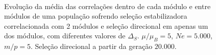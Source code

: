 \begin{figure}[p]
   \vspace{-18pt}
   \vspace{11pt}
   \\
   \caption{ Evolução da média das correlações dentro de cada módulo
      e entre módulos de uma população sofrendo seleção estabilizadora
      correlacionada com 2 módulos e seleção direcional em apenas um dos
   módulos, com diferentes valores de $\Delta_S$. $\mu/\mu_B = 5$, $Ne =
   5.000$, $m/p=5$. Seleção direcional a partir da geração $20.000$.}
   \label{CoAVG}
\end{figure}

